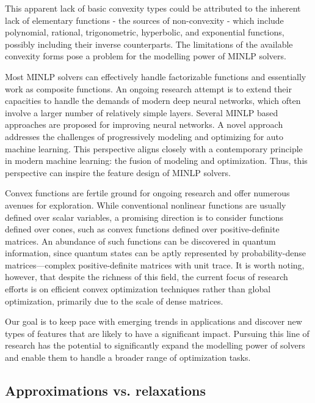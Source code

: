 This apparent lack of basic convexity types could be attributed to the inherent lack of elementary functions - the sources of non-convexity - which include polynomial, rational, trigonometric, hyperbolic, and exponential functions, possibly including their inverse counterparts. The limitations of the available convexity forms pose a problem for the modelling power of MINLP solvers.

Most MINLP solvers can effectively handle factorizable functions and essentially work as composite functions. An ongoing research attempt is to extend their capacities to handle the demands of modern deep neural networks, which often involve a larger number of relatively simple layers. Several MINLP based approaches \cite{tsay2021partition,tjandraatmadja2020convex,zhang2023optimizing} are proposed for improving neural networks. A novel approach \cite{baudart2021pipeline,ceccon2022omlt}  addresses the challenges of progressively modeling and optimizing for auto machine learning. This perspective aligns closely with a contemporary principle in modern machine learning: the fusion of modeling and optimization. Thus, this perspective  can inspire the feature design of MINLP solvers.


Convex functions are fertile ground for ongoing research and offer numerous avenues for exploration. While conventional nonlinear functions are usually defined over scalar variables, a promising direction is to consider functions defined over cones, such as convex functions defined over positive-definite matrices. An abundance of such functions can be discovered in quantum information, since quantum states can be aptly represented by probability-dense matrices—complex positive-definite matrices with unit trace. It is worth noting, however, that despite the richness of this field, the current focus of research efforts is on efficient convex optimization techniques rather than global optimization, primarily due to the scale of dense matrices.

Our goal is to keep pace with emerging trends in applications and discover new types of features that are likely to have a significant impact. Pursuing this line of research has the potential to significantly expand the modelling power of solvers and enable them to handle a broader range of optimization tasks.

\subsection{Approximations vs. relaxations}

